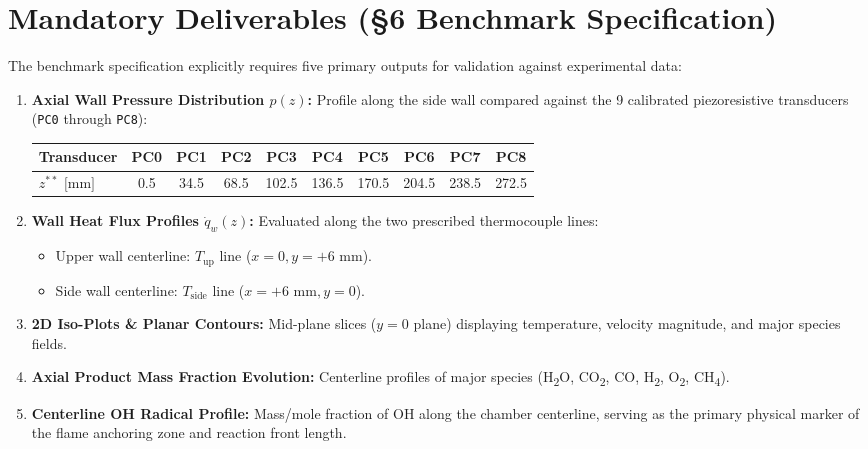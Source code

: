 \documentclass[11pt,a4paper]{article}
\begin{document}
\section{Mandatory Deliverables (\S6 Benchmark Specification)}
The benchmark specification explicitly requires five primary outputs for validation against experimental data:
\begin{enumerate}\setlength\itemsep{0.35em}
    \item \textbf{Axial Wall Pressure Distribution $p(z)$:} Profile along the side wall compared against the 9 calibrated piezoresistive transducers (\texttt{PC0} through \texttt{PC8}):
    \begin{center}
    \small
    \begin{tabular}{lccccccccc}
    \toprule
    \textbf{Transducer} & PC0 & PC1 & PC2 & PC3 & PC4 & PC5 & PC6 & PC7 & PC8 \\
    \midrule
    $z^{**}\text{ [mm]}$ & 0.5 & 34.5 & 68.5 & 102.5 & 136.5 & 170.5 & 204.5 & 238.5 & 272.5 \\
    \bottomrule
    \end{tabular}
    \end{center}
    \item \textbf{Wall Heat Flux Profiles $\dot{q}_w(z)$:} Evaluated along the two prescribed thermocouple lines:
    \begin{itemize}
        \item Upper wall centerline: $T_\text{up}$ line ($x=0, y=+6\text{ mm}$).
        \item Side wall centerline: $T_\text{side}$ line ($x=+6\text{ mm}, y=0$).
    \end{itemize}
    \item \textbf{2D Iso-Plots \& Planar Contours:} Mid-plane slices ($y=0$ plane) displaying temperature, velocity magnitude, and major species fields.
    \item \textbf{Axial Product Mass Fraction Evolution:} Centerline profiles of major species (H\textsubscript{2}O, CO\textsubscript{2}, CO, H\textsubscript{2}, O\textsubscript{2}, CH\textsubscript{4}).
    \item \textbf{Centerline OH Radical Profile:} Mass/mole fraction of OH along the chamber centerline, serving as the primary physical marker of the flame anchoring zone and reaction front length.
\end{enumerate}

\end{document}
